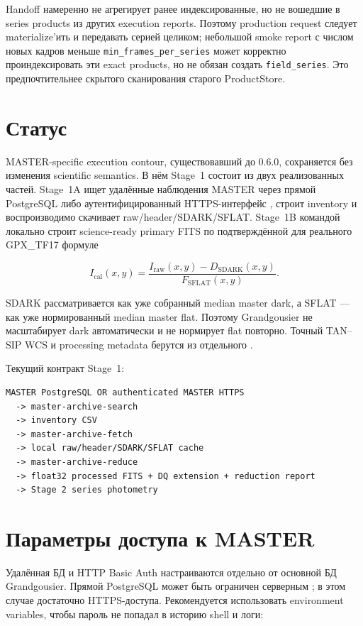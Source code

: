 Handoff намеренно не агрегирует ранее индексированные, но не вошедшие в series products из других execution reports. Поэтому production request следует materialize'ить и передавать серией целиком; небольшой smoke report с числом новых кадров меньше \texttt{min\_frames\_per\_series} может корректно проиндексировать эти exact products, но не обязан создать \texttt{field\_series}. Это предпочтительнее скрытого сканирования старого ProductStore.

\section{Статус}

MASTER-specific execution contour, существовавший до 0.6.0, сохраняется без изменения scientific semantics. В нём Stage~1 состоит из двух реализованных частей. Stage~1A ищет удалённые наблюдения MASTER через прямой PostgreSQL либо аутентифицированный HTTPS-интерфейс , строит inventory и воспроизводимо скачивает raw/header/SDARK/SFLAT. Stage~1B командой  локально строит science-ready primary FITS по подтверждённой для реального GPX\_TF17 формуле

\[
I_{\mathrm{cal}}(x,y)=\frac{I_{\mathrm{raw}}(x,y)-D_{\mathrm{SDARK}}(x,y)}{F_{\mathrm{SFLAT}}(x,y)}.
\]

SDARK рассматривается как уже собранный median master dark, а SFLAT --- как уже нормированный median master flat. Поэтому Grandgousier не масштабирует dark автоматически и не нормирует flat повторно. Точный TAN--SIP WCS и processing metadata берутся из отдельного .

Текущий контракт Stage~1:

\begin{verbatim}
MASTER PostgreSQL OR authenticated MASTER HTTPS
  -> master-archive-search
  -> inventory CSV
  -> master-archive-fetch
  -> local raw/header/SDARK/SFLAT cache
  -> master-archive-reduce
  -> float32 processed FITS + DQ extension + reduction report
  -> Stage 2 series photometry
\end{verbatim}

\section{Параметры доступа к MASTER}

Удалённая БД и HTTP Basic Auth настраиваются отдельно от основной БД Grandgousier. Прямой PostgreSQL может быть ограничен серверным ; в этом случае достаточно HTTPS-доступа. Рекомендуется использовать environment variables, чтобы пароль не попадал в историю shell и логи:

